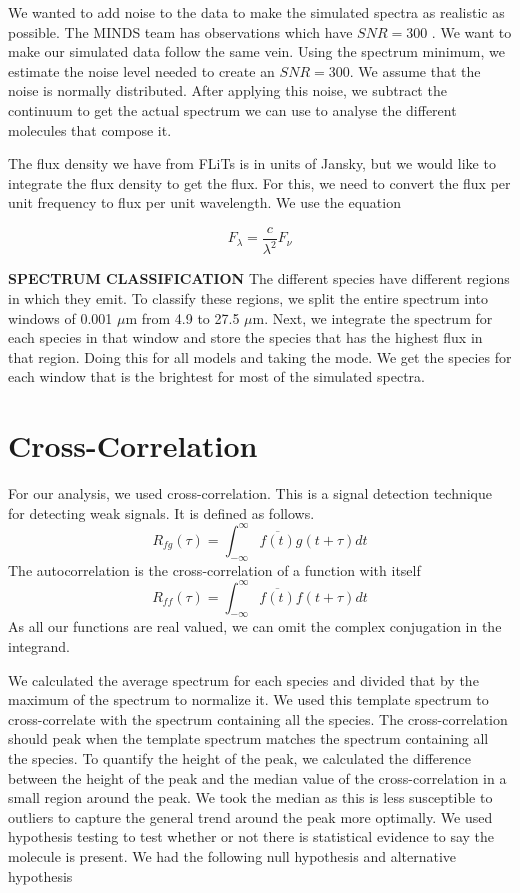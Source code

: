 \documentclass[twoside, single, authoryear, semicolon]{lion-msc}
\newcommand{\4}{$_4$}
\newcommand{\3}{$_3$}
\newcommand{\2}{$_2$}
\begin{document}
We wanted to add noise to the data to make the simulated spectra as realistic as possible. The MINDS team has observations which have $SNR = 300$ \citep{SOURCE}. We want to make our simulated data follow the same vein. Using the spectrum minimum, we estimate the noise level needed to create an $SNR = 300$. We assume that the noise is normally distributed. After applying this noise, we subtract the continuum to get the actual spectrum we can use to analyse the different molecules that compose it.


The flux density we have from FLiTs is in units of Jansky, but we would like to integrate the flux density to get the flux. For this, we need to convert the flux per unit frequency to flux per unit wavelength. We use the equation

\begin{equation}
    F_\lambda=\frac{c}{\lambda^2}F_\nu
\end{equation}

\textbf{SPECTRUM CLASSIFICATION}
The different species have different regions in which they emit. To classify these regions, we split the entire spectrum into windows of 0.001 $\mu$m from 4.9 to 27.5 $\mu$m. Next, we integrate the spectrum for each species in that window and store the species that has the highest flux in that region. Doing this for all models and taking the mode. We get the species for each window that is the brightest for most of the simulated spectra.  
\section{Cross-Correlation}
For our analysis, we used cross-correlation. This is a signal detection technique for detecting weak signals. It is defined as follows. 
\begin{equation}
    R_{fg}(\tau)=\int^\infty_{-\infty}\overline{f(t)}g(t+\tau)dt
\end{equation}
The autocorrelation is the cross-correlation of a function with itself
\begin{equation}
    R_{ff}(\tau)=\int^\infty_{-\infty}\overline{f(t)}f(t+\tau)dt
\end{equation}
As all our functions are real valued, we can omit the complex conjugation in the integrand.

We calculated the average spectrum for each species and divided that by the maximum of the spectrum to normalize it. We used this template spectrum to cross-correlate with the spectrum containing all the species. The cross-correlation should peak when the template spectrum matches the spectrum containing all the species. To quantify the height of the peak, we calculated the difference between the height of the peak and the median value of the cross-correlation in a small region around the peak. We took the median as this is less susceptible to outliers to capture the general trend around the peak more optimally. We used hypothesis testing to test whether or not there is statistical evidence to say the molecule is present. We had the following null hypothesis and alternative hypothesis
\end{document}
